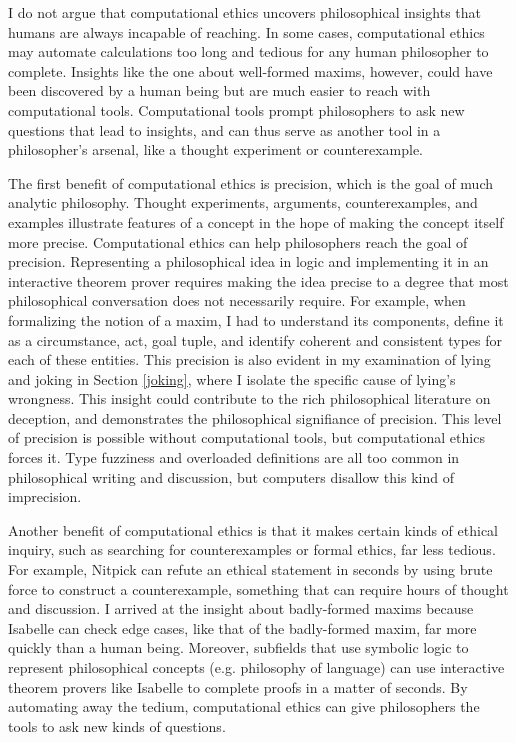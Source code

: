\begin{isabellebody}
\begin{isamarkuptext}
I do not argue that computational ethics uncovers philosophical insights that humans are always incapable 
of reaching. In some cases, computational ethics may automate calculations too long and tedious for 
any human philosopher to complete. Insights like the one about well-formed maxims, however, could 
have been discovered by a human being but are much easier to reach with computational tools. Computational tools prompt philosophers 
to ask new questions that lead to insights, and can thus serve as another tool in a philosopher's arsenal, like a 
thought experiment or counterexample.

The first benefit of computational ethics is precision, which is the goal of much analytic
philosophy. Thought experiments, arguments, counterexamples, and examples 
illustrate features of a concept in the hope of making the concept itself more precise. Computational 
ethics can help philosophers reach the goal of precision. Representing a philosophical idea in logic 
and implementing it in an interactive theorem prover requires making the idea precise to a degree 
that most philosophical conversation does not necessarily require. For example, when formalizing the notion of a 
maxim, I had to understand its components, define it as a circumstance, act, goal tuple, and identify
coherent and consistent types for each of these entities. This precision is also evident in my examination
of lying and joking in Section \ref{joking}, where I isolate the specific cause of lying's wrongness.
This insight could contribute to the rich philosophical literature on deception, and demonstrates the 
philosophical signifiance of precision. This level of precision is possible 
without computational tools, but computational ethics forces it. Type fuzziness and overloaded definitions 
are all too common in philosophical writing and discussion, but computers disallow this kind of imprecision.

Another benefit of computational ethics is that it makes certain kinds of ethical inquiry, such as 
searching for counterexamples or formal ethics, far less tedious. For example, Nitpick can refute 
an ethical statement in seconds by using brute force to construct a counterexample, something that can require hours
of thought and discussion. I arrived at the insight about badly-formed maxims because Isabelle 
can check edge cases, like that of the badly-formed maxim, far more quickly than a human being. Moreover, 
subfields that use symbolic logic to represent philosophical concepts (e.g. philosophy of language) can 
use interactive theorem provers like Isabelle to complete proofs in a matter of seconds. By automating 
away the tedium, computational ethics can give philosophers the tools to ask new kinds of questions.


\end{isamarkuptext}
\end{isabellebody}

